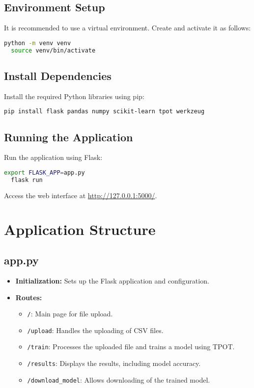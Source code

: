\documentclass{article}
\begin{document}
\subsection{Environment Setup}
It is recommended to use a virtual environment. Create and activate it as follows:
\begin{lstlisting}[language=bash]
  python -m venv venv
  source venv/bin/activate
\end{lstlisting}

\subsection{Install Dependencies}
Install the required Python libraries using pip:
\begin{lstlisting}[language=bash]
  pip install flask pandas numpy scikit-learn tpot werkzeug
\end{lstlisting}

\subsection{Running the Application}
Run the application using Flask:
\begin{lstlisting}[language=bash]
  export FLASK_APP=app.py
  flask run
\end{lstlisting}
Access the web interface at \url{http://127.0.0.1:5000/}.

\section{Application Structure}
\subsection{app.py}
\begin{itemize}
    \item \textbf{Initialization:} Sets up the Flask application and configuration.
    \item \textbf{Routes:}
    \begin{itemize}
        \item \texttt{/}: Main page for file upload.
        \item \texttt{/upload}: Handles the uploading of CSV files.
        \item \texttt{/train}: Processes the uploaded file and trains a model using TPOT.
        \item \texttt{/results}: Displays the results, including model accuracy.
        \item \texttt{/download\_model}: Allows downloading of the trained model.
    \end{itemize}
\end{itemize}
\end{document}
